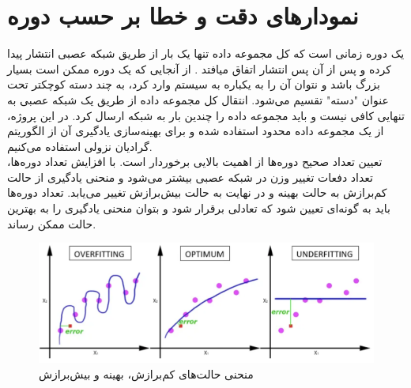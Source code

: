 



\section[نمودار‌های دقت و خطا بر حسب دوره]{ نمودار‌های دقت و خطا بر حسب دوره }
یک دوره زمانی است که کل مجموعه داده تنها یک بار از طریق شبکه عصبی انتشار پیدا کرده و پس از آن پس انتشار اتفاق میافتد
. از آنجایی که یک دوره ممکن است بسیار بزرگ باشد و نتوان آن را به یکباره به سیستم وارد کرد، به چند دسته کوچکتر تحت عنوان "دسته" تقسیم می‌شود. انتقال کل مجموعه داده از طریق یک شبکه عصبی به تنهایی کافی نیست و باید مجموعه داده را چندین بار به شبکه ارسال کرد. در این پروژه، از یک مجموعه داده محدود استفاده شده و برای بهینه‌سازی یادگیری آن از الگوریتم گرادیان نزولی استفاده می‌کنیم.
\\
تعیین تعداد صحیح دوره‌ها از اهمیت بالایی برخوردار است. با افزایش تعداد دوره‌ها،‌ تعداد دفعات تغییر وزن در شبکه عصبی بیشتر می‌شود و منحنی یادگیری از حالت کم‌برازش به حالت بهینه و در نهایت به حالت بیش‌برازش تغییر می‌یابد. تعداد دوره‌ها باید به گونه‌ای تعیین شود که تعادلی برقرار شود و بتوان منحنی یادگیری را به بهترین حالت ممکن رساند.\\



\begin{figure}[h]
    \centering
    \includegraphics[width=1\textwidth]{fitting.png}
    \caption[منحنی‌ حالت‌های کم‌برازش، بهینه و بیش‌برازش]{منحنی‌ حالت‌های کم‌برازش، بهینه و بیش‌برازش \cite{wwwreddi92:online}}
\end{figure}



